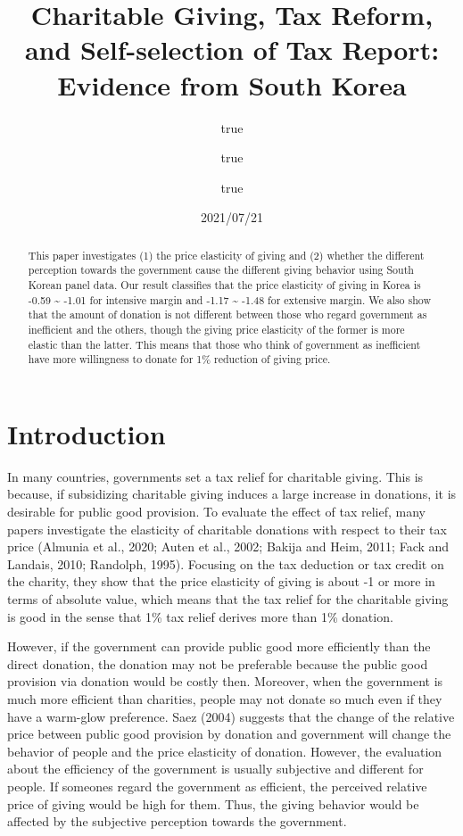 \documentclass[
]{article}
\title{Charitable Giving, Tax Reform, and Self-selection of Tax Report: Evidence from South Korea}
\author{true \and true \and true}
\date{2021/07/21}
\begin{document}
\maketitle
\begin{abstract}
This paper investigates (1) the price elasticity of giving and (2) whether the different perception towards the government cause the different giving behavior using South Korean panel data. Our result classifies that the price elasticity of giving in Korea is -0.59 \textasciitilde{} -1.01 for intensive margin and -1.17 \textasciitilde{} -1.48 for extensive margin. We also show that the amount of donation is not different between those who regard government as inefficient and the others, though the giving price elasticity of the former is more elastic than the latter. This means that those who think of government as inefficient have more willingness to donate for 1\% reduction of giving price.
\end{abstract}

\hypertarget{introduction}{%
\section{Introduction}\label{introduction}}

In many countries, governments set a tax relief for charitable giving. This is because, if subsidizing charitable giving induces a large increase in donations, it is desirable for public good provision. To evaluate the effect of tax relief, many papers investigate the elasticity of charitable donations with respect to their tax price (Almunia et al., 2020; Auten et al., 2002; Bakija and Heim, 2011; Fack and Landais, 2010; Randolph, 1995). Focusing on the tax deduction or tax credit on the charity, they show that the price elasticity of giving is about -1 or more in terms of absolute value, which means that the tax relief for the charitable giving is good in the sense that 1\% tax relief derives more than 1\% donation.

However, if the government can provide public good more efficiently than the direct donation, the donation may not be preferable because the public good provision via donation would be costly then.
Moreover, when the government is much more efficient than charities, people may not donate so much even if they have a warm-glow preference. Saez (2004) suggests that the change of the relative price between public good provision by donation and government will change the behavior of people and the price elasticity of donation.
However, the evaluation about the efficiency of the government is usually subjective and different for people. If someones regard the government as efficient, the perceived relative price of giving would be high for them. Thus, the giving behavior would be affected by the subjective perception towards the government.
\end{document}
